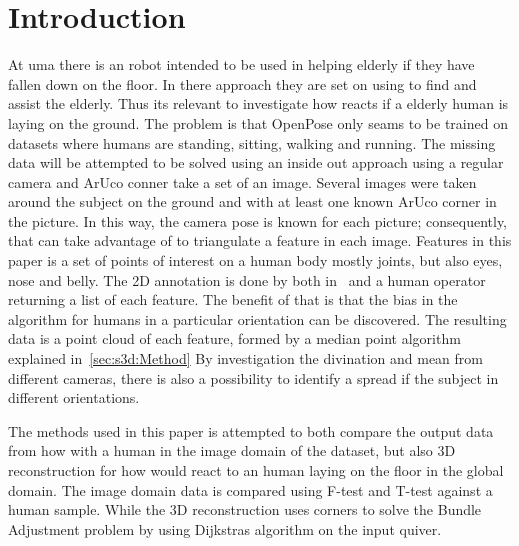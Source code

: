 \section{Introduction}%
\label{sec:s3d:ntroduction}
At \ac{uma} there is an robot intended to be used in helping elderly if they have fallen down on the floor.
In there approach they are set on using \openpose to find and assist the elderly.
Thus its relevant to investigate how \openpose reacts if a elderly human is laying on the ground.
The problem is that OpenPose only seams to be trained on datasets where humans are standing, sitting, walking and running.
The missing data will be attempted to be solved using an inside out approach using a regular camera and ArUco conner take a set of an image.
Several images were taken around the subject on the ground and with at least one known ArUco corner in the picture.
In this way, the camera pose is known for each picture; consequently, that can take advantage of to triangulate a feature in each image.
Features in this paper is a set of points of interest on a human body mostly joints, but also eyes, nose and belly.
The 2D annotation is done by both \openpose in~\cite{qiao2017openpose} and a human operator returning a list of each feature.
The benefit of that is that the bias in the \openpose  algorithm for humans in a particular orientation can be discovered.
The resulting data is a point cloud of each feature, formed by a median point algorithm explained in~\ref{sec:s3d:Method}
By investigation the divination and mean from different cameras, there is also a possibility to identify a spread if the subject in different orientations.

The methods used in this paper is attempted to both compare the output data from how \opnepose with a human in the image domain of the dataset, but also 3D reconstruction for how \onpepose would react to an human laying on the floor in the global domain.
The image domain data is compared using F-test and T-test against a human sample.
While the 3D reconstruction uses \aruco corners to solve the Bundle Adjustment problem by using Dijkstras algorithm on the input quiver.




